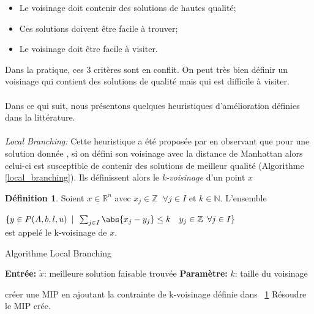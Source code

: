 \documentclass[12pt,a4paper,oneside]{book}
\theoremstyle{definition}
\newtheorem{definition}{Définition}[section]
\newcommand{\R}{\mathbb{R}}
\newcommand{\N}{\mathbb{N}}
\newcommand{\Z}{\mathbb{Z}}
\begin{document}
	\begin{itemize}
		\item[] Le voisinage doit contenir des solutions de hautes qualité;
		\item[] Ces solutions doivent être facile à trouver;
		\item[] Le voisinage doit être facile à visiter.
	\end{itemize}
	\vspace{5pt}
	Dans la pratique, ces 3 critères sont en conflit. On peut très bien définir un voisinage qui contient des solutions de qualité mais qui est difficile à visiter.
	\paragraph{}
	Dans ce qui suit, nous présentons quelques heuristiques d'amélioration définies dans la littérature.
	
	\paragraph{}
	\textit{Local Branching:} Cette heuristique a été proposée par \cite{fischetti2003local} en observant que pour une solution donnée , si on défini son voisinage avec la distance de Manhattan alors celui-ci est susceptible de contenir des solutions de meilleur qualité (Algorithme \ref{local_branching}). Ils définissent alors le \textit{k-voisinage} d'un point $x$
	\begin{definition} \label{def:kneighborhood}
		Soient $ x \in \R^n$ avec $ x_j \in \Z \hspace{7pt} \forall j \in I $ et $k \in \N$. L'ensemble

		\vspace{12pt}

		$\{ y \in P(A,b,l,u) \hspace{5pt} | \hspace{5pt} \sum_{j \in I} \abs{x_j - y_j} \leq k \hspace{10pt} y_j \in \Z \hspace{5pt} \forall j \in I \}$ \\
		
		
		est appelé le k-voisinage de $x$.
		 
	\end{definition}

	\begin{algorithm} \label{local_branching}
		\caption{Algorithme Local Branching}
		\SetAlgoLined
		\DontPrintSemicolon
		
		\textbf{Entrée:} 	$\tilde{x}$: meilleure solution faisable trouvée \;
		\textbf{Paramètre:} $k$: taille du voisinage \;
						 
		
		créer une MIP en ajoutant la contrainte de k-voisinage définie dans ~\ref{def:kneighborhood} \;
		Résoudre le MIP crée.
		
	\end{algorithm}
		
\end{document}
